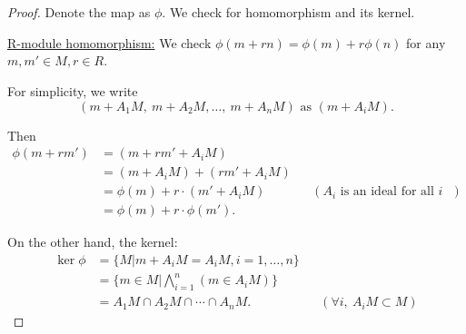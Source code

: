 \documentclass{article}
\theoremstyle{plain}
\begin{document}
\section{}
\begin{proof}
  Denote the map as $\phi$. We check for homomorphism and its kernel.

\underline{R-module homomorphism:} We check $\phi(m+rn)=\phi(m)+r\phi(n)$ for any
$m,m'\in M, r\in R$.

For simplicity, we write
\[(m+A_{1}M,\ m+A_{2}M,\ldots,\ m+A_{n}M)\text{ as }(m+A_{i}M).\]

Then
\begin{align*}
  \phi(m+rm')
  &=(m+rm'+A_{i}M)\\
  &=(m+A_{i}M) + (rm'+A_{i}M)\\
  &=\phi(m) + r\cdot(m'+A_{i}M)&&(A_{i}\text{ is an ideal for all $i$ })\\
  &=\phi(m) + r\cdot\phi(m').
\end{align*}

On the other hand, the kernel:
\begin{align*}
  \ker\phi&=\{M|m+A_{i}M=A_{i}M, i=1,\ldots,n\}\\
  &=\{m\in M|\bigwedge_{i=1}^{n}(m\in A_{i}M)\}\\
  &=A_{1}M\cap A_{2}M\cap\cdots\cap A_{n}M.&&(\forall i,\ A_{i}M\subset M)
\end{align*}
\end{proof}
\end{document}
